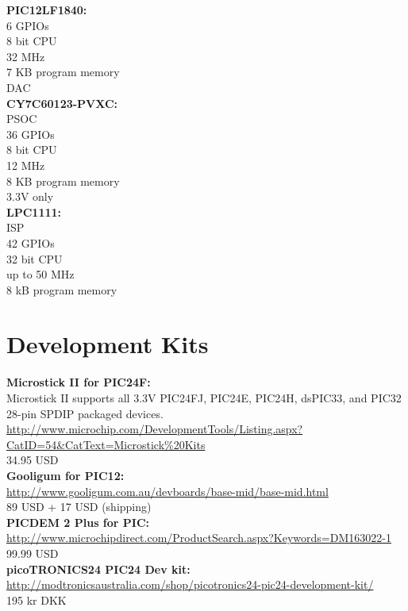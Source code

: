 \textbf{PIC12LF1840:}\\
6 GPIOs\\
8 bit CPU\\
32 MHz\\
7 KB program memory\\
DAC\\

\textbf{CY7C60123-PVXC:}\\
PSOC\\
36 GPIOs\\
8 bit CPU\\
12 MHz\\
8 KB program memory\\
3.3V only \\

\textbf{LPC1111:}\\
ISP\\
42 GPIOs\\
32 bit CPU\\
up to 50 MHz\\
8 kB program memory\\


\chapter{Development Kits}
\textbf{Microstick II for PIC24F:}\\
Microstick II supports all 3.3V PIC24FJ, PIC24E, PIC24H, dsPIC33, and PIC32 28-pin SPDIP packaged devices.\\
\url{http://www.microchip.com/DevelopmentTools/Listing.aspx?CatID=54&CatText=Microstick\%20Kits}\\
34.95 USD\\

\textbf{Gooligum for PIC12:}\\
\url{http://www.gooligum.com.au/devboards/base-mid/base-mid.html}\\
89 USD + 17 USD (shipping)\\

\textbf{PICDEM 2 Plus for PIC:}\\
\url{http://www.microchipdirect.com/ProductSearch.aspx?Keywords=DM163022-1}\\
99.99 USD\\

\textbf{picoTRONICS24 PIC24 Dev kit:}\\
\url{http://modtronicsaustralia.com/shop/picotronics24-pic24-development-kit/}\\
195 kr DKK\\

